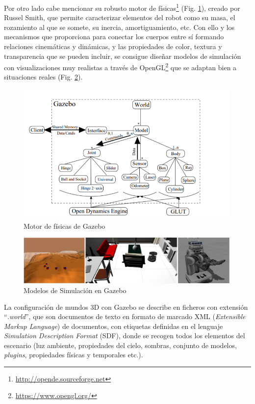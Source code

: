 Por otro lado cabe mencionar su robusto motor de físicas\footnote{\url{http://opende.sourceforge.net}} (Fig. \ref{gazebo-physics}), creado por Russel Smith, que permite caracterizar elementos del robot como su masa, el rozamiento al que se somete, su inercia, amortiguamiento, etc. Con ello y los mecanismos que proporciona para conectar los cuerpos entre sí formando relaciones cinemáticas y dinámicas, y las propiedades de color, textura y transparencia que se pueden incluir, se consigue diseñar modelos de simulación con visualizaciones muy realistas a través de OpenGL\footnote{\url{https://www.opengl.org/}} que se adaptan bien a situaciones reales (Fig. \ref{gazebo-models}).

\begin{figure}[!hbtp]  \centering\noindent
    \includegraphics[width=0.99\textwidth]{figures/gazebo-engine.png}
    \caption{Motor de físicas de Gazebo}
    \label{gazebo-physics}
\end{figure}

\begin{figure}[!hbtp]  \centering\noindent
    \includegraphics[width=0.99\textwidth]{figures/gazebo-models.png}
    \caption{Modelos de Simulación en Gazebo}
    \label{gazebo-models}
\end{figure}
 
La configuración de mundos 3D con Gazebo se describe en ficheros con extensión ``\textit{.world}'', que son documentos de texto en formato de marcado XML (\textit{Extensible Markup Language}) de documentos, con etiquetas definidas en el lenguaje \textit{Simulation Description Format} (SDF), donde se
recogen todos los elementos del escenario (luz ambiente, propiedades del cielo, sombras, conjunto de modelos, \textit{plugins}, propiedades
físicas y temporales etc.).
 
